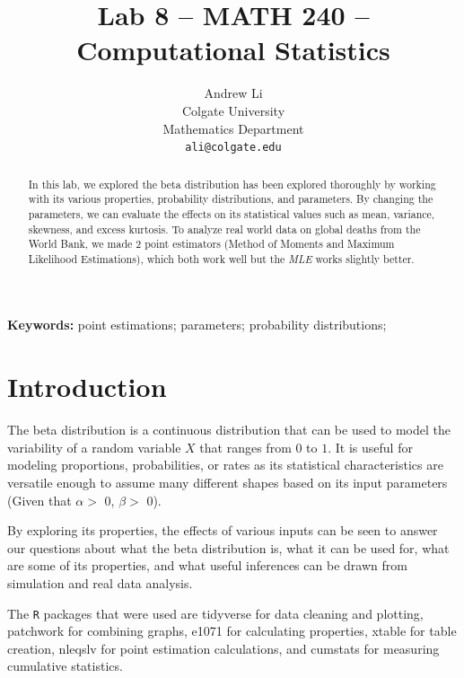 \documentclass{article}\usepackage[]{graphicx}\usepackage[]{xcolor}
\begin{document}
\vspace{-1in}
\title{Lab 8 -- MATH 240 -- Computational Statistics}

\author{
  Andrew Li \\
  Colgate University  \\
  Mathematics Department  \\
  {\tt ali@colgate.edu}
}

\date{}

\maketitle

\begin{multicols}{2}
\begin{abstract}
In this lab, we explored the beta distribution has been explored thoroughly by working with its various properties, probability distributions, and parameters. By changing the parameters, we can evaluate the effects on its statistical values such as mean, variance, skewness, and excess kurtosis. To analyze real world data on global deaths from the World Bank, we made 2 point estimators (Method of Moments and Maximum Likelihood Estimations), which both work well but the \emph{MLE} works slightly better. 

\end{abstract}

\noindent \textbf{Keywords:} point estimations; parameters; probability distributions; 

\section{Introduction}
The beta distribution is a continuous distribution that can be used to model the variability of a random variable $X$ that ranges from $0$ to $1$. It is useful for modeling proportions, probabilities, or rates as its statistical characteristics are versatile enough to assume many different shapes based on its input parameters (Given that $\alpha >$ 0, $\beta >$ 0). 

By exploring its properties, the effects of various inputs can be seen to answer our questions about what the beta distribution is, what it can be used for, what are some of its properties, and what useful inferences can be drawn from simulation and real data analysis. 

The \texttt{R} packages that were used are tidyverse\citep{tidyverse} for data cleaning and plotting, patchwork\citep{patchwork} for combining graphs, e1071\citep{e1071} for calculating properties, xtable\citep{xtable} for table creation, nleqslv\citep{nleqslv} for point estimation calculations, and cumstats\citep{cumstats} for measuring cumulative statistics. 


\end{multicols}
\end{document}
